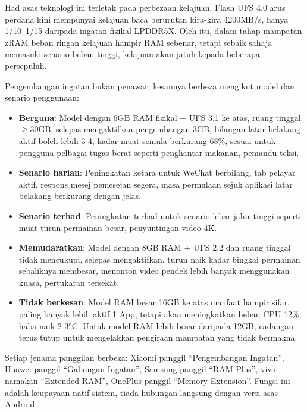 
Had asas teknologi ini terletak pada perbezaan kelajuan. Flash UFS 4.0 arus perdana kini mempunyai kelajuan baca berurutan kira-kira 4200MB/s, hanya 1/10–1/15 daripada ingatan fizikal LPDDR5X. Oleh itu, dalam tahap mampatan zRAM beban ringan kelajuan hampir RAM sebenar, tetapi sebaik sahaja memasuki senario beban tinggi, kelajuan akan jatuh kepada beberapa persepuluh.


Pengembangan ingatan bukan penawar, kesannya berbeza mengikut model dan senario penggunaan:

\begin{itemize}
  \item \textbf{Berguna}: Model dengan 6GB RAM fizikal + UFS 3.1 ke atas, ruang tinggal $\geq$30GB, selepas mengaktifkan pengembangan 3GB, bilangan latar belakang aktif boleh lebih 3-4, kadar muat semula berkurang 68\%, sesuai untuk pengguna pelbagai tugas berat seperti penghantar makanan, pemandu teksi.
  \item \textbf{Senario harian}: Peningkatan ketara untuk WeChat berbilang, tab pelayar aktif, respons mesej pemesejan segera, masa permulaan sejuk aplikasi latar belakang berkurang dengan jelas.
  \item \textbf{Senario terhad}: Peningkatan terhad untuk senario lebar jalur tinggi seperti muat turun permainan besar, penyuntingan video 4K.
  \item \textbf{Memudaratkan}: Model dengan 8GB RAM + UFS 2.2 dan ruang tinggal tidak mencukupi, selepas mengaktifkan, turun naik kadar bingkai permainan sebaliknya membesar, menonton video pendek lebih banyak menggunakan kuasa, pertukaran tersekat.
  \item \textbf{Tidak berkesan}: Model RAM besar 16GB ke atas manfaat hampir sifar, paling banyak lebih aktif 1 App, tetapi akan meningkatkan beban CPU 12\%, haba naik 2-3°C. Untuk model RAM lebih besar daripada 12GB, cadangan terus tutup untuk mengelakkan pengiraan mampatan yang tidak bermakna.
\end{itemize}


Setiap jenama panggilan berbeza: Xiaomi panggil “Pengembangan Ingatan”, Huawei panggil “Gabungan Ingatan”, Samsung panggil “RAM Plus”, vivo namakan “Extended RAM”, OnePlus panggil “Memory Extension”. Fungsi ini adalah keupayaan natif sistem, tiada hubungan langsung dengan versi asas Android.

